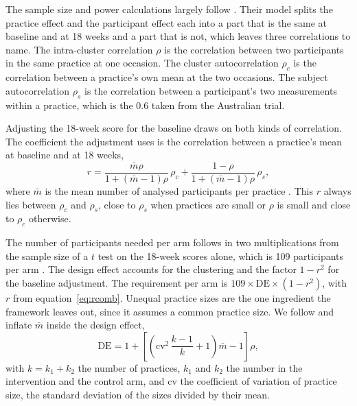 \documentclass[11pt,a4paper]{article}
\begin{document}
The sample size and power calculations largely follow \citet{teerenstra2012}. Their
model splits the practice effect and the participant effect each into a part
that is the same at baseline and at 18 weeks and a part that is not, which
leaves three correlations to name. The intra-cluster correlation $\rho$ is
the correlation between two participants in the same practice at one
occasion. The cluster autocorrelation $\rho_c$ is the correlation between a
practice's own mean at the two occasions. The subject autocorrelation
$\rho_s$ is the correlation between a participant's two measurements within
a practice, which is the 0.6 taken from the Australian trial.

Adjusting the 18-week score for the baseline draws on both kinds of
correlation. The coefficient the adjustment uses is the correlation between a
practice's mean at baseline and at 18 weeks,
\begin{equation}
\label{eq:rcomb}
r = \frac{\bar m \rho}{1 + (\bar m - 1)\rho}\,\rho_c
  + \frac{1 - \rho}{1 + (\bar m - 1)\rho}\,\rho_s ,
\end{equation}
where $\bar m$ is the mean number of analysed participants per practice
\citep[eq.~5]{teerenstra2012}. This $r$ always lies between $\rho_c$ and
$\rho_s$, close to $\rho_s$ when practices are small or $\rho$ is small and
close to $\rho_c$ otherwise.

The number of participants needed per arm follows in two multiplications from
the sample size of a $t$ test on the 18-week scores alone, which is 109
participants per arm \citep[section 2.3]{teerenstra2012}. The design effect
accounts for the clustering and the factor $1 - r^2$ for the baseline
adjustment. The requirement per arm is
$109 \times \mathrm{DE} \times (1 - r^2)$, with $r$
from equation~\eqref{eq:rcomb}. Unequal
practice sizes are the one ingredient the framework leaves out, since it
assumes a common practice size. We follow \citet{eldridge2006} and inflate
$\bar m$ inside the design effect,
\begin{equation}
\label{eq:de}
\mathrm{DE} = 1 + \left[ \left( \mathrm{cv}^2\,\frac{k-1}{k} + 1 \right) \bar m - 1 \right]\rho ,
\end{equation}
with $k = k_1 + k_2$ the number of practices, $k_1$ and $k_2$ the number in
the intervention and the control arm, and $\mathrm{cv}$ the coefficient of
variation of practice size, the standard deviation of the sizes divided by
their mean.
\end{document}
